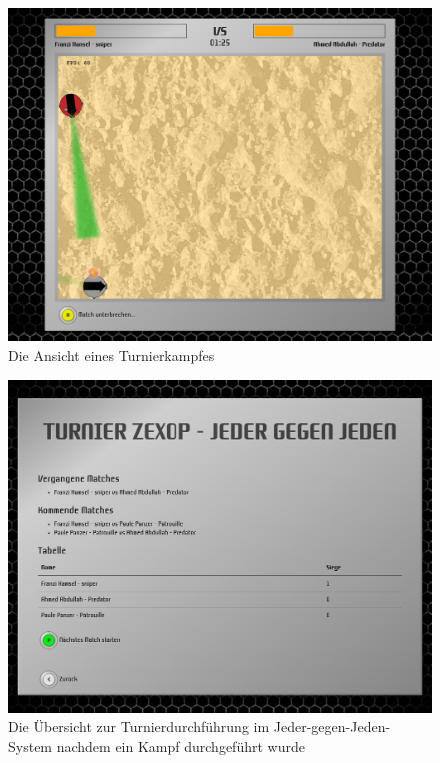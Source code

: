 \begin{figure}
  \centering
  \label{tournament-execution-match}
  \includegraphics[width=15cm, keepaspectratio]{figures/14-turnierdurchfuehrung-kampf.png}
  \caption{Die Ansicht eines Turnierkampfes}
\end{figure}

\begin{figure}
  \centering
  \label{tournament-execution-mid}
  \includegraphics[width=15cm, keepaspectratio]{figures/13-turnierdurchfuehrung-mitte.png}
  \caption{Die Übersicht zur Turnierdurchführung im Jeder-gegen-Jeden-System nachdem ein Kampf durchgeführt wurde}
\end{figure}


